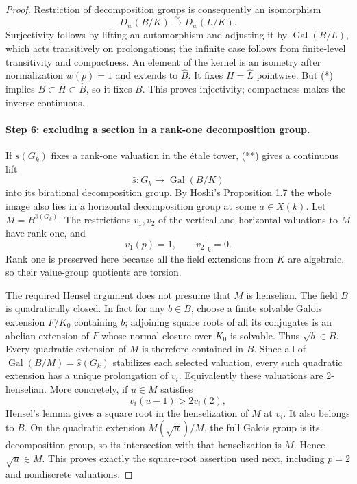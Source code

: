 \begin{proof}
Restriction of decomposition groups is consequently an isomorphism
\[
                  D_w(B/K)\xrightarrow{\sim}D_w(L/K).       \tag{**}
\]
Surjectivity follows by lifting an automorphism and adjusting it by
$\operatorname{Gal}(B/L)$, which acts transitively on prolongations;
the infinite case follows from finite-level transitivity and
compactness.  An element of the kernel is an isometry after
normalization $w(p)=1$ and extends to $\widehat B$.  It fixes
$H=\widehat L$ pointwise.  But (*) implies
$B\subset H\subset\widehat B$, so it fixes $B$.  This proves
injectivity; compactness makes the inverse continuous.

\paragraph{Step 6: excluding a section in a rank-one decomposition group.}

If $s(G_k)$ fixes a rank-one valuation in the \'etale tower,
(**) gives a continuous lift
\[
             \widehat s:G_k\longrightarrow\operatorname{Gal}(B/K)
\]
into its birational decomposition group.  By Hoshi's Proposition 1.7
the whole image also lies in a horizontal decomposition group at
some $a\in X(k)$.  Let
$M=B^{\widehat s(G_k)}$.  The restrictions $v_1,v_2$ of the vertical
and horizontal valuations to $M$ have rank one, and
\[
                         v_1(p)=1,\qquad v_2|_k=0.
\]
Rank one is preserved here because all the field extensions from
$K$ are algebraic, so their value-group quotients are torsion.

The required Hensel argument does not presume that $M$ is henselian.
The field $B$ is quadratically closed.  In fact for any $b\in B$,
choose a finite solvable Galois extension $F/K_0$ containing $b$;
adjoining square roots of all its conjugates is an abelian extension
of $F$ whose normal closure over $K_0$ is solvable.  Thus $\sqrt b\in B$.
Every quadratic extension of $M$ is therefore contained in $B$.
Since all of $\operatorname{Gal}(B/M)=\widehat s(G_k)$ stabilizes
each selected valuation, every such quadratic extension has a
unique prolongation of $v_i$.  Equivalently these valuations are
2-henselian.  More concretely, if $u\in M$ satisfies
\[
                             v_i(u-1)>2v_i(2),
\]
Hensel's lemma gives a square root in the henselization of $M$ at
$v_i$.  It also belongs to $B$.  On the quadratic extension
$M(\sqrt u)/M$, the full Galois group is its decomposition group,
so its intersection with that henselization is $M$.  Hence
$\sqrt u\in M$.  This proves exactly the square-root assertion
used next, including $p=2$ and nondiscrete valuations.


\end{proof}
